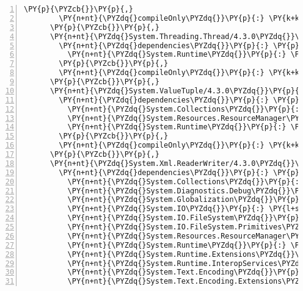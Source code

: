 \begin{Verbatim}[commandchars=\\\{\},numbers=left,firstnumber=1,stepnumber=1,numberblanklines=0]
        \PY{p}{\PYZcb{}}\PY{p}{,}
        \PY{n+nt}{\PYZdq{}compileOnly\PYZdq{}}\PY{p}{:} \PY{k+kc}{true}
      \PY{p}{\PYZcb{}}\PY{p}{,}
      \PY{n+nt}{\PYZdq{}System.Threading.Thread/4.3.0\PYZdq{}}\PY{p}{:} \PY{p}{\PYZob{}}
        \PY{n+nt}{\PYZdq{}dependencies\PYZdq{}}\PY{p}{:} \PY{p}{\PYZob{}}
          \PY{n+nt}{\PYZdq{}System.Runtime\PYZdq{}}\PY{p}{:} \PY{l+s+s2}{\PYZdq{}4.3.0\PYZdq{}}
        \PY{p}{\PYZcb{}}\PY{p}{,}
        \PY{n+nt}{\PYZdq{}compileOnly\PYZdq{}}\PY{p}{:} \PY{k+kc}{true}
      \PY{p}{\PYZcb{}}\PY{p}{,}
      \PY{n+nt}{\PYZdq{}System.ValueTuple/4.3.0\PYZdq{}}\PY{p}{:} \PY{p}{\PYZob{}}
        \PY{n+nt}{\PYZdq{}dependencies\PYZdq{}}\PY{p}{:} \PY{p}{\PYZob{}}
          \PY{n+nt}{\PYZdq{}System.Collections\PYZdq{}}\PY{p}{:} \PY{l+s+s2}{\PYZdq{}4.3.0\PYZdq{}}\PY{p}{,}
          \PY{n+nt}{\PYZdq{}System.Resources.ResourceManager\PYZdq{}}\PY{p}{:} \PY{l+s+s2}{\PYZdq{}4.3.0\PYZdq{}}\PY{p}{,}
          \PY{n+nt}{\PYZdq{}System.Runtime\PYZdq{}}\PY{p}{:} \PY{l+s+s2}{\PYZdq{}4.3.0\PYZdq{}}
        \PY{p}{\PYZcb{}}\PY{p}{,}
        \PY{n+nt}{\PYZdq{}compileOnly\PYZdq{}}\PY{p}{:} \PY{k+kc}{true}
      \PY{p}{\PYZcb{}}\PY{p}{,}
      \PY{n+nt}{\PYZdq{}System.Xml.ReaderWriter/4.3.0\PYZdq{}}\PY{p}{:} \PY{p}{\PYZob{}}
        \PY{n+nt}{\PYZdq{}dependencies\PYZdq{}}\PY{p}{:} \PY{p}{\PYZob{}}
          \PY{n+nt}{\PYZdq{}System.Collections\PYZdq{}}\PY{p}{:} \PY{l+s+s2}{\PYZdq{}4.3.0\PYZdq{}}\PY{p}{,}
          \PY{n+nt}{\PYZdq{}System.Diagnostics.Debug\PYZdq{}}\PY{p}{:} \PY{l+s+s2}{\PYZdq{}4.3.0\PYZdq{}}\PY{p}{,}
          \PY{n+nt}{\PYZdq{}System.Globalization\PYZdq{}}\PY{p}{:} \PY{l+s+s2}{\PYZdq{}4.3.0\PYZdq{}}\PY{p}{,}
          \PY{n+nt}{\PYZdq{}System.IO\PYZdq{}}\PY{p}{:} \PY{l+s+s2}{\PYZdq{}4.3.0\PYZdq{}}\PY{p}{,}
          \PY{n+nt}{\PYZdq{}System.IO.FileSystem\PYZdq{}}\PY{p}{:} \PY{l+s+s2}{\PYZdq{}4.3.0\PYZdq{}}\PY{p}{,}
          \PY{n+nt}{\PYZdq{}System.IO.FileSystem.Primitives\PYZdq{}}\PY{p}{:} \PY{l+s+s2}{\PYZdq{}4.3.0\PYZdq{}}\PY{p}{,}
          \PY{n+nt}{\PYZdq{}System.Resources.ResourceManager\PYZdq{}}\PY{p}{:} \PY{l+s+s2}{\PYZdq{}4.3.0\PYZdq{}}\PY{p}{,}
          \PY{n+nt}{\PYZdq{}System.Runtime\PYZdq{}}\PY{p}{:} \PY{l+s+s2}{\PYZdq{}4.3.0\PYZdq{}}\PY{p}{,}
          \PY{n+nt}{\PYZdq{}System.Runtime.Extensions\PYZdq{}}\PY{p}{:} \PY{l+s+s2}{\PYZdq{}4.3.0\PYZdq{}}\PY{p}{,}
          \PY{n+nt}{\PYZdq{}System.Runtime.InteropServices\PYZdq{}}\PY{p}{:} \PY{l+s+s2}{\PYZdq{}4.3.0\PYZdq{}}\PY{p}{,}
          \PY{n+nt}{\PYZdq{}System.Text.Encoding\PYZdq{}}\PY{p}{:} \PY{l+s+s2}{\PYZdq{}4.3.0\PYZdq{}}\PY{p}{,}
          \PY{n+nt}{\PYZdq{}System.Text.Encoding.Extensions\PYZdq{}}\PY{p}{:} \PY{l+s+s2}{\PYZdq{}4.3.0\PYZdq{}}\PY{p}{,}

\end{Verbatim}

